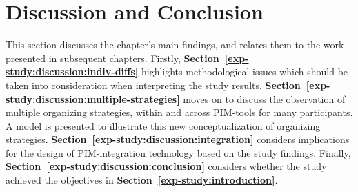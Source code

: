 \newpage
\section{Discussion and Conclusion}
\label{exp-study:conclusion}


This section discusses the chapter's main findings, and relates them to the work presented in subsequent chapters.  Firstly, \textbf{Section~\ref{exp-study:discussion:indiv-diffs}} highlights methodological issues which should be taken into consideration when interpreting the study results. \textbf{Section~\ref{exp-study:discussion:multiple-strategies}} moves on to discuss the observation of multiple organizing strategies, within and across PIM-tools for many participants.  A model is presented to illustrate this new conceptualization of organizing strategies.
\textbf{Section~\ref{exp-study:discussion:integration}} considers implications for the design of PIM-integration technology based on the study findings.
Finally, \textbf{Section~\ref{exp-study:discussion:conclusion}} considers whether the study achieved the objectives in \textbf{Section~\ref{exp-study:introduction}}.



